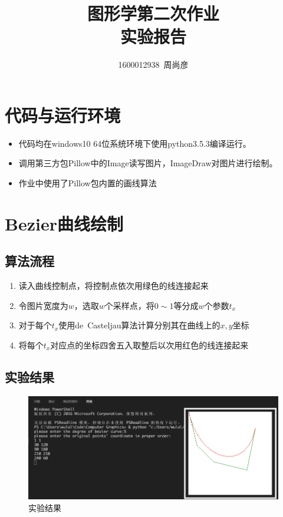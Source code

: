 \documentclass[11pt,UTF8]{article}
\title{\fontsize{25pt}{\baselineskip}\textbf{图形学第二次作业\\[2ex]实验报告}}
\author{1600012938~周尚彦}
\begin{document}
\thispagestyle{plain}

\maketitle

\tableofcontents

\setcounter{section}{0}

\section{代码与运行环境}
	\begin{itemize}
		\item 代码均在windows10 64位系统环境下使用python3.5.3编译运行。
		\item 调用第三方包Pillow中的Image读写图片，ImageDraw对图片进行绘制。
		\item 作业中使用了Pillow包内置的画线算法
	\end{itemize}
\newpage

\section{Bezier曲线绘制}
\subsection{算法流程}
	\begin{enumerate}
		\item 读入曲线控制点，将控制点依次用绿色的线连接起来
		\item 令图片宽度为$w$，选取$w$个采样点，将$0 \sim 1$等分成$w$个参数$t_x$
		\item 对于每个$t_x$使用de\ Casteljau算法计算分别其在曲线上的$x,y$坐标
		\item 将每个$t_x$对应点的坐标四舍五入取整后以次用红色的线连接起来
	\end{enumerate}

\subsection{实验结果}
	\begin{figure}[H]
		\centering
		\includegraphics[width=\textwidth]{demo.png}
		\caption{实验结果}\label{results}
	\end{figure}

\newpage
\end{document}
